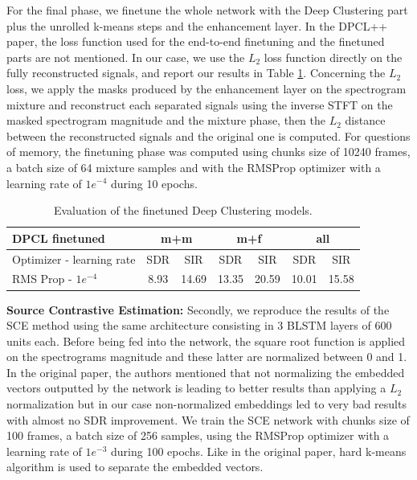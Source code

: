 \documentclass[master, tikz, final,11pt, dvipdfmx]{iscs-thesis}
\begin{document}
For the final phase, we finetune the whole network with the Deep Clustering part plus the unrolled k-means steps and the enhancement layer. In the DPCL++ paper, the loss function used for the end-to-end finetuning and the finetuned parts are not mentioned. In our case, we use the $L_2$ loss function directly on the fully reconstructed signals, and report our results in Table \ref{table:DPCL400fine}. Concerning the $L_2$ loss, we apply the masks produced by the enhancement layer on the spectrogram mixture and reconstruct each separated signals using the inverse STFT on the masked spectrogram magnitude and the mixture phase, then the $L_2$ distance between the reconstructed signals and the original one is computed. For questions of memory, the finetuning phase was computed using chunks size of 10240 frames, a batch size of 64 mixture samples and with the RMSProp optimizer with a learning rate of $1e^{-4}$ during 10 epochs.

\begin{table}[h]
\centering
\begin{tabular}{l|c|c|c|c|c|c}
DPCL finetuned & \multicolumn{2}{c|}{m+m} & \multicolumn{2}{c|}{m+f} & \multicolumn{2}{c}{all} \\ 
\hline 
 Optimizer - learning rate & SDR & SIR & SDR & SIR & SDR & SIR \\ 
\hline 
RMS Prop - $1e^{-4}$  & 8.93 & 14.69 & 13.35 & 20.59 & 10.01 & 15.58 \\ 

\end{tabular}
\caption{Evaluation of the finetuned Deep Clustering models.}
\label{table:DPCL400fine}
\end{table}


\textbf{Source Contrastive Estimation:} Secondly, we reproduce the results of the SCE \cite{SCE} method using the same architecture consisting in 3 BLSTM layers of 600 units each. Before being fed into the network, the square root function is applied on the spectrograms magnitude and these latter are normalized between 0 and 1. In the original paper, the authors mentioned that not normalizing the embedded vectors outputted by the network is leading to better results than applying a $L_2$ normalization but in our case non-normalized embeddings led to very bad results with almost no SDR improvement. We train the SCE network with chunks size of 100 frames, a batch size of 256 samples, using the RMSProp optimizer with a learning rate of $1e^{-3}$ during 100 epochs. Like in the original paper, hard k-means algorithm is used to separate the embedded vectors.
\end{document}
